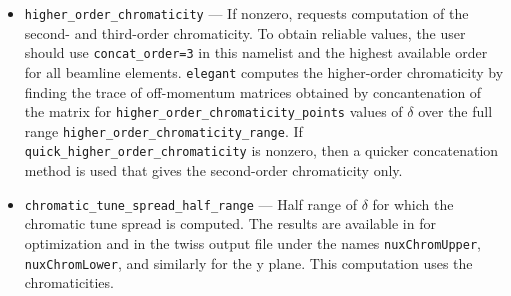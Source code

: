 \documentclass[11pt]{article}
\begin{document}
\begin{itemize}
\item \verb|higher_order_chromaticity| --- If nonzero, requests
computation of the second- and third-order chromaticity.  To obtain
reliable values, the user should use \verb|concat_order=3| in this
namelist and the highest available order for all beamline elements.
{\tt elegant} computes the higher-order chromaticity by finding the
trace of off-momentum matrices obtained by concantenation of the
matrix for \verb|higher_order_chromaticity_points| values of $\delta$
over the full range \verb|higher_order_chromaticity_range|.
If \verb|quick_higher_order_chromaticity| is nonzero, then a quicker concatenation method is
used that gives the second-order chromaticity only.

\item \verb|chromatic_tune_spread_half_range| --- Half range of $\delta$ for which the
        chromatic tune spread is computed.  The results are available in for optimization  and
        in the twiss output file under the names \verb|nuxChromUpper|, \verb|nuxChromLower|, 
        and similarly for the y plane.  This computation uses the chromaticities.


\end{itemize}
\end{document}
